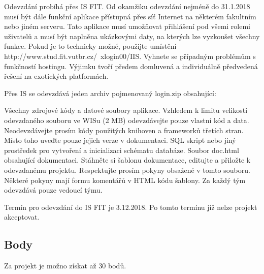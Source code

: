 \documentclass[11pt, a4paper, titlepage]{article}
\begin{document}
Odevzdání probíhá přes IS FIT. Od okamžiku odevzdání nejméně do 31.1.2018 musí být dále funkční aplikace přístupná přes síť Internet na některém fakultním nebo jiném serveru. Tato aplikace musí umožňovat přihlášení pod všemi rolemi uživatelů a musí být naplněna ukázkovými daty, na kterých lze vyzkoušet všechny funkce. Pokud je to technicky možné, použijte umístění http://www.stud.fit.vutbr.cz/~xlogin00/IIS. Vyhnete se případným problémům s funkčností hostingu. Výjimku tvoří předem domluvená a individuálně předvedená řešení na exotických platformách.

Přes IS se odevzdává jeden archiv pojmenovaný login.zip obsahující:

Všechny zdrojové kódy a datové soubory aplikace. Vzhledem k limitu velikosti odevzdaného souboru ve WISu (2 MB) odevzdávejte pouze vlastní kód a data. Neodevzdávejte prosím kódy použitých knihoven a frameworků třetích stran. Místo toho uveďte pouze jejich verze v dokumentaci.
SQL skript nebo jiný prostředek pro vytvoření a inicializaci schématu databáze.
Soubor doc.html obsahující dokumentaci. Stáhněte si šablonu dokumentace, editujte a přiložte k odevzdanému projektu. Respektujte prosím pokyny obsažené v tomto souboru. Některé pokyny mají formu komentářů v HTML kódu šablony.
Za každý tým odevzdává pouze vedoucí týmu.

Termín pro odevzdání do IS FIT je 3.12.2018. Po tomto termínu již nelze projekt akceptovat.


\subsection*{Body}

Za projekt je možno získat až 30 bodů.

\end{document}
